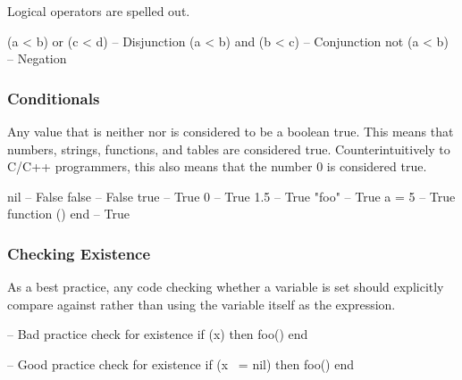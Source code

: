 Logical operators are spelled out.

\begin{LuaCode}
(a < b) or (c < d)  -- Disjunction
(a < b) and (b < c) -- Conjunction
not (a < b)         -- Negation
\end{LuaCode}

\subsubsection{Conditionals}

Any value that is neither  nor  is considered to be
a boolean true.  This means that numbers, strings, functions, and tables are
considered true.  Counterintuitively to C/C++ programmers, this also means that
the number 0 is considered true.

\begin{LuaCode}
nil             -- False
false           -- False
true            -- True
0               -- True
1.5             -- True
"foo"           -- True
{ a = 5 }       -- True
function () end -- True
\end{LuaCode}

\subsubsection{Checking Existence}

As a best practice, any code checking whether a variable is set should
explicitly compare against  rather than using the variable itself
as the expression.

\begin{lrbox}{\LeftBoxA}
\begin{NestedLuaCode}[linewidth=2.5in]
-- Bad practice check for existence
if (x) then
	foo()
end
\end{NestedLuaCode}
\end{lrbox}

\begin{lrbox}{\RightBoxA}
\begin{NestedLuaCode}[linewidth=2.5in]
-- Good practice check for existence
if (x ~= nil) then
	foo()
end
\end{NestedLuaCode}
\end{lrbox}

\begin{SideBySideGrid}

	\UseLuaCodeBox{\LeftBoxA} \NextColumn \UseLuaCodeBox{\RightBoxA}

\LastRow
\end{SideBySideGrid}

